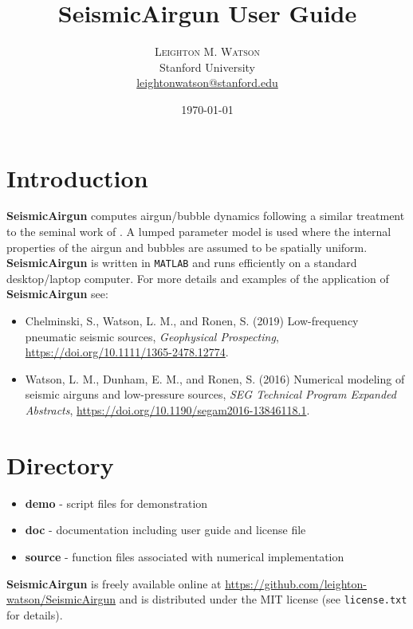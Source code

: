 \documentclass[10pt]{article}
\title{SeismicAirgun User Guide} %
\author{%
\textsc{Leighton M. Watson} \\%
\normalsize Stanford University \\ %
\normalsize \href{mailto:leightonwatson@stanford.edu}{leightonwatson@stanford.edu} %
}
\date{\today} %
\begin{document}
\maketitle


\section{Introduction}
{\bf SeismicAirgun} computes airgun/bubble dynamics following a similar treatment to the seminal work of \citet{Ziolkowski1970}. A lumped parameter model is used where the internal properties of the airgun and bubbles are assumed to be spatially uniform. {\bf SeismicAirgun} is written in \texttt{MATLAB} and runs efficiently on a standard desktop/laptop computer. For more details and examples of the application of {\bf SeismicAirgun} see:
\begin{itemize}
\item Chelminski, S., Watson, L. M., and Ronen, S. (2019) Low-frequency pneumatic seismic sources, \emph{Geophysical Prospecting}, \href{https://doi.org/10.1111/1365-2478.12774}{https://doi.org/10.1111/1365-2478.12774}.
\item Watson, L. M., Dunham, E. M., and Ronen, S. (2016) Numerical modeling of seismic airguns and low-pressure sources, \emph{SEG Technical Program Expanded Abstracts}, \href{https://doi.org/10.1190/segam2016-13846118.1}{https://doi.org/10.1190/segam2016-13846118.1}.
\end{itemize}

\section{Directory}
\begin{itemize}
\item {\bf demo} - script files for demonstration
\item {\bf doc} - documentation including user guide and license file
\item{\bf source} - function files associated with numerical implementation
\end{itemize}

{\bf SeismicAirgun} is freely available online at \href{https://github.com/leighton-watson/SeismicAirgun}{https://github.com/leighton-watson/SeismicAirgun} and is distributed under the MIT license (see \texttt{license.txt} for details). 


\newpage


\end{document}
